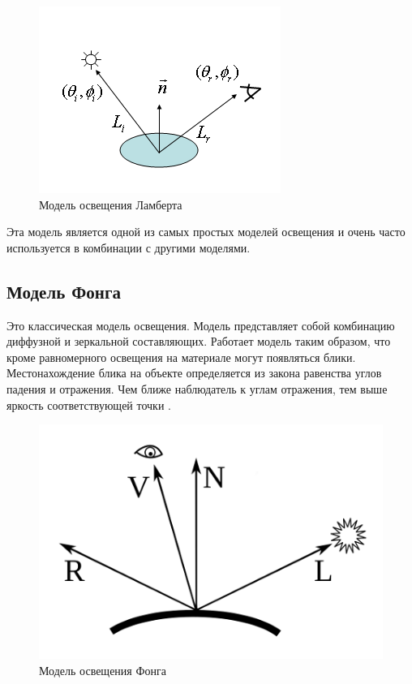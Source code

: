 \begin{figure}[ht!]
	\begin{center}
		\captionsetup{singlelinecheck = false, justification=centerfirst}
		\includegraphics[scale=0.8]{assets/mod_lam.png}
		\caption{Модель освещения Ламберта}
		\label{img:mod_lam}
	\end{center}
	
	
\end{figure}

Эта модель является одной из самых простых моделей освещения и очень часто используется в комбинации с другими моделями.

\subsection{Модель Фонга}

Это классическая модель освещения. Модель представляет собой комбинацию диффузной и зеркальной составляющих. Работает модель таким образом, что кроме равномерного освещения на материале могут появляться блики. Местонахождение блика на объекте определяется из закона равенства углов падения и отражения. Чем ближе наблюдатель к углам отражения, тем выше яркость соответствующей точки \cite{lamber_fong}.

\begin{figure}[ht!]
	\begin{center}
		\captionsetup{singlelinecheck = false, justification=centerfirst}
		\includegraphics[scale=0.8]{assets/mod_fong.png}
		\caption{Модель освещения Фонга}
		\label{img:mod_fong}
	\end{center}
	
\end{figure}


